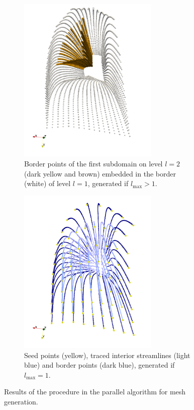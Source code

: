 \begin{figure}%
  \centering%
  \begin{subfigure}[t]{0.45\textwidth}%
    \centering%
    \includegraphics[height=8cm]{images/parallel_fiber_estimation/06_subdomain.png}
    \caption{Border points of the first subdomain on level $l=2$ (dark yellow and brown) embedded in the border (white) of level $l=1$, generated if $l_\text{max} > 1$.}%
    \label{fig:06_subdomain}%
  \end{subfigure}
  \quad
  \begin{subfigure}[t]{0.45\textwidth}%
    \centering%
    \includegraphics[height=8cm]{images/parallel_fiber_estimation/08_final.png}
    \caption{Seed points (yellow), traced interior streamlines (light blue) and border points (dark blue), generated if $l_\text{max}=1$.}%
    \label{fig:08_final}%
  \end{subfigure}   
   
  \caption{Results of the procedure in the parallel algorithm for mesh generation.}%
  \label{fig:improved}%
\end{figure}%

